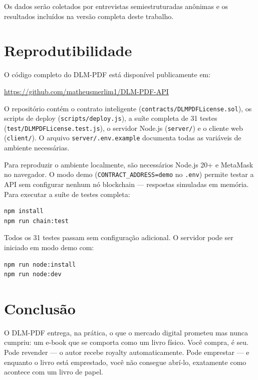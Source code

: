 \documentclass[12pt]{article}
\begin{document}
Os dados serão coletados por entrevistas semiestruturadas anônimas e os resultados incluídos na versão completa deste trabalho.

\section{Reprodutibilidade}

O código completo do DLM-PDF está disponível publicamente em:

\begin{center}
\url{https://github.com/matheusmerlim1/DLM-PDF-API}
\end{center}

O repositório contém o contrato inteligente (\texttt{contracts/DLMPDFLicense.sol}), os scripts de deploy (\texttt{scripts/deploy.js}), a suíte completa de 31 testes (\texttt{test/DLMPDFLicense.test.js}), o servidor Node.js (\texttt{server/}) e o cliente web (\texttt{client/}). O arquivo \texttt{server/.env.example} documenta todas as variáveis de ambiente necessárias.

Para reproduzir o ambiente localmente, são necessários Node.js 20+ e MetaMask no navegador. O modo demo (\texttt{CONTRACT\_ADDRESS=demo} no \texttt{.env}) permite testar a API sem configurar nenhum nó blockchain — respostas simuladas em memória. Para executar a suíte de testes completa:

\begin{verbatim}
npm install
npm run chain:test
\end{verbatim}

Todos os 31 testes passam sem configuração adicional. O servidor pode ser iniciado em modo demo com:

\begin{verbatim}
npm run node:install
npm run node:dev
\end{verbatim}


\section{Conclusão}

O DLM-PDF entrega, na prática, o que o mercado digital prometeu mas nunca cumpriu: um e-book que se comporta como um livro físico. Você compra, é seu. Pode revender — o autor recebe royalty automaticamente. Pode emprestar — e enquanto o livro está emprestado, você não consegue abrí-lo, exatamente como acontece com um livro de papel.
\end{document}
